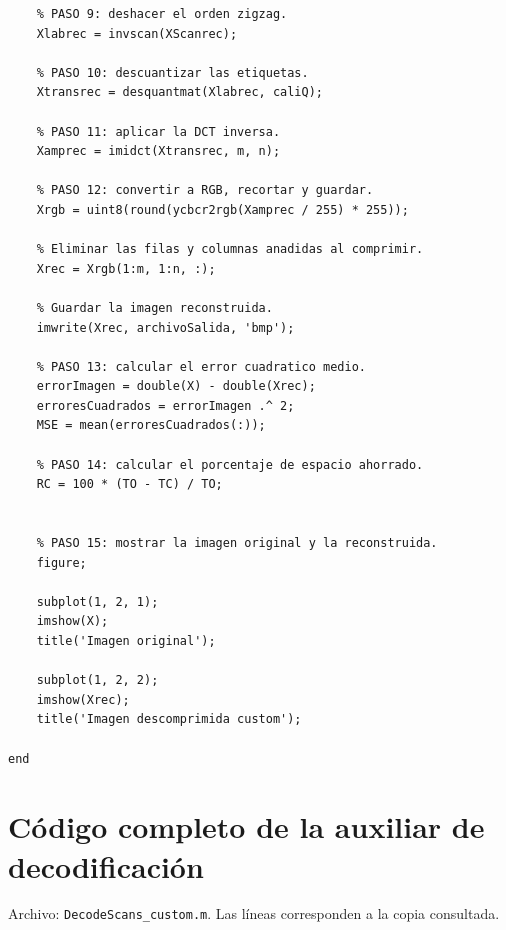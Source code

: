 \documentclass[11pt,a4paper,oneside]{report}
\begin{document}
\begin{lstlisting}
    % PASO 9: deshacer el orden zigzag.
    Xlabrec = invscan(XScanrec);

    % PASO 10: descuantizar las etiquetas.
    Xtransrec = desquantmat(Xlabrec, caliQ);

    % PASO 11: aplicar la DCT inversa.
    Xamprec = imidct(Xtransrec, m, n);

    % PASO 12: convertir a RGB, recortar y guardar.
    Xrgb = uint8(round(ycbcr2rgb(Xamprec / 255) * 255));

    % Eliminar las filas y columnas anadidas al comprimir.
    Xrec = Xrgb(1:m, 1:n, :);

    % Guardar la imagen reconstruida.
    imwrite(Xrec, archivoSalida, 'bmp');

    % PASO 13: calcular el error cuadratico medio.
    errorImagen = double(X) - double(Xrec);
    erroresCuadrados = errorImagen .^ 2;
    MSE = mean(erroresCuadrados(:));

    % PASO 14: calcular el porcentaje de espacio ahorrado.
    RC = 100 * (TO - TC) / TO;


    % PASO 15: mostrar la imagen original y la reconstruida.
    figure;

    subplot(1, 2, 1);
    imshow(X);
    title('Imagen original');

    subplot(1, 2, 2);
    imshow(Xrec);
    title('Imagen descomprimida custom');
    
end
\end{lstlisting}

\chapter{Código completo de la auxiliar de decodificación}\label{src:DecodeScans_custom.m}

Archivo: \texttt{DecodeScans\_custom.m}. Las líneas corresponden a la copia consultada.
\end{document}
